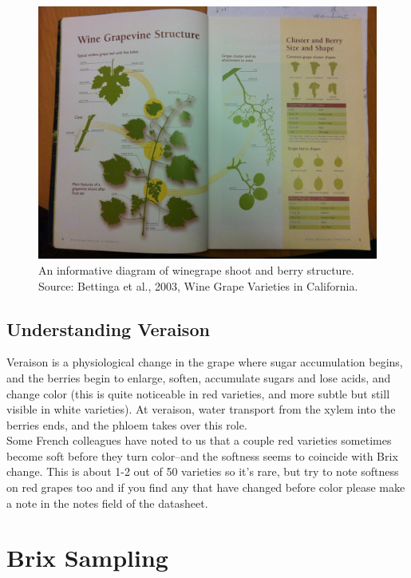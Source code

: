 \documentclass[11pt,letter]{article}
\begin{document}
\begin{enumerate}
\begin{figure}
  \includegraphics[width=\linewidth]{Bettiga2003Diagram.jpg}
  \caption{An informative diagram of winegrape shoot and berry structure. Source: Bettinga et al., 2003, Wine Grape Varieties in California. }
  \label{fig:Bettiga2003Diagram}
\end{figure}
	
\end{enumerate}

\subsection{Understanding Veraison}
Veraison is a physiological change in the grape where sugar accumulation begins, and the berries begin to enlarge, soften, accumulate sugars and lose acids, and change color (this is quite noticeable in red varieties, and more subtle but still visible in white varieties). At veraison, water transport from the xylem into the berries ends, and the phloem takes over this role.\\ 

Some French colleagues have noted to us that a couple red varieties sometimes become soft before they turn color--and the softness seems to coincide with Brix change. This is about 1-2 out of 50 varieties so it's rare, but try to note softness on red grapes too and if you find any that have changed before color please make a note in the notes field of the datasheet.

\section{Brix Sampling}
\end{document}
